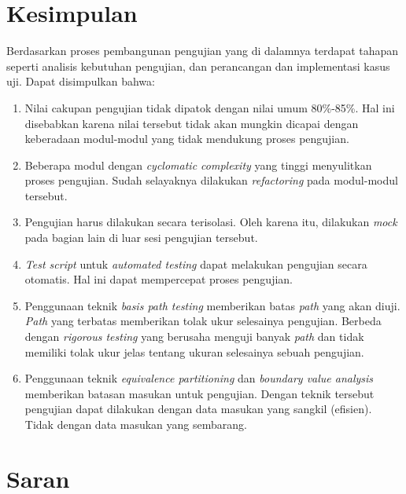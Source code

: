 


\section{Kesimpulan}

Berdasarkan proses pembangunan pengujian yang di dalamnya
terdapat tahapan seperti analisis kebutuhan pengujian, dan
perancangan dan implementasi kasus uji. Dapat disimpulkan bahwa:

\begin{enumerate}
\item Nilai cakupan pengujian tidak dipatok dengan nilai umum
  80\%-85\%. Hal ini disebabkan karena nilai tersebut tidak akan
  mungkin dicapai dengan keberadaan modul-modul yang tidak mendukung
  proses pengujian.
\item Beberapa modul dengan \emph{cyclomatic complexity} yang tinggi
  menyulitkan proses pengujian. Sudah selayaknya dilakukan
  \emph{refactoring} pada modul-modul tersebut.
\item Pengujian harus dilakukan secara terisolasi. Oleh karena itu,
  dilakukan \emph{mock} pada bagian lain di luar sesi pengujian
  tersebut.
\item \emph{Test script} untuk \emph{automated testing} dapat
  melakukan pengujian secara otomatis. Hal ini dapat mempercepat proses
  pengujian.
\item Penggunaan teknik \emph{basis path testing} memberikan batas
  \emph{path} yang akan diuji. \emph{Path} yang terbatas memberikan
  tolak ukur selesainya pengujian. Berbeda dengan \emph{rigorous
    testing} yang berusaha menguji banyak \emph{path} dan tidak
  memiliki tolak ukur jelas tentang ukuran selesainya sebuah
  pengujian.
\item Penggunaan teknik \emph{equivalence partitioning} dan
  \emph{boundary value analysis} memberikan batasan masukan untuk
  pengujian. Dengan teknik tersebut pengujian dapat dilakukan dengan
  data masukan yang sangkil (efisien). Tidak dengan data masukan yang sembarang.
\end{enumerate}

\section{Saran}


